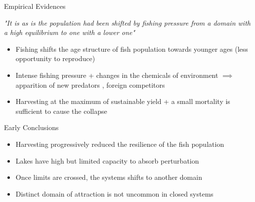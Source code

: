 \documentclass[11,aspectratio=1610]{beamer}
\begin{document}
\begin{frame}{Empirical Evidences}


\textit{"It is as is the population had been shifted by fishing pressure from a domain with a high equilibrium to one with a lower one"}

\vfill

\begin{footnotesize}
\begin{itemize}
  \item Fishing shifts the age structure of fish population towards younger ages (less opportunity to reproduce)
  \item Intense fishing pressure + changes in the chemicals of environment $\implies$ apparition of new predators , foreign competitors 
  \item Harvesting at the maximum of sustainable yield + a small mortality is \alert{sufficient} to cause the collapse
\end{itemize}


\end{footnotesize}




\end{frame}

\begin{frame}{Early Conclusions}

\begin{itemize}
\item Harvesting progressively reduced the \alert{resilience} of the fish population
\item Lakes have high but limited capacity to absorb perturbation
\item Once limits are crossed, the systems shifts to another domain
\item Distinct domain of attraction is not uncommon in closed systems 
\end{itemize}

\end{frame}
\end{document}
